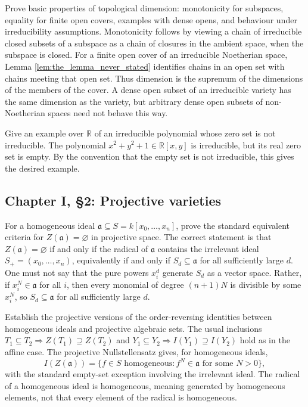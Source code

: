 \documentclass[12pt]{article}
\theoremstyle{plain}
\theoremstyle{definition}
\newcommand{\bb}[1]{\mathbb{#1}}
\begin{document}
\questionpar Prove basic properties of topological dimension: monotonicity for subspaces, equality for finite open covers, examples with dense opens, and behaviour under irreducibility assumptions.
\solutionpar Monotonicity follows by viewing a chain of irreducible closed subsets of a subspace as a chain of closures in the ambient space, when the subspace is closed. For a finite open cover of an irreducible Noetherian space, Lemma \ref{lem:the_lemma_never_stated} identifies chains in an open set with chains meeting that open set. Thus dimension is the supremum of the dimensions of the members of the cover. A dense open subset of an irreducible variety has the same dimension as the variety, but arbitrary dense open subsets of non-Noetherian spaces need not behave this way.

\questionpar Give an example over $\bb R$ of an irreducible polynomial whose zero set is not irreducible.
\solutionpar The polynomial $x^2+y^2+1\in\bb R[x,y]$ is irreducible, but its real zero set is empty. By the convention that the empty set is not irreducible, this gives the desired example.

\subsection{Chapter I, \S 2: Projective varieties}

\questionpar For a homogeneous ideal $\mathfrak a\subseteq S=k[x_0,\ldots,x_n]$, prove the standard equivalent criteria for $Z(\mathfrak a)=\varnothing$ in projective space.
\solutionpar The correct statement is that $Z(\mathfrak a)=\varnothing$ if and only if the radical of $\mathfrak a$ contains the irrelevant ideal $S_+=(x_0,\ldots,x_n)$, equivalently if and only if $S_d\subseteq\mathfrak a$ for all sufficiently large $d$. One must not say that the pure powers $x_i^d$ generate $S_d$ as a vector space. Rather, if $x_i^N\in\mathfrak a$ for all $i$, then every monomial of degree $(n+1)N$ is divisible by some $x_i^N$, so $S_d\subseteq\mathfrak a$ for all sufficiently large $d$.

\questionpar Establish the projective versions of the order-reversing identities between homogeneous ideals and projective algebraic sets.
\solutionpar The usual inclusions $T_1\subseteq T_2\Rightarrow Z(T_1)\supseteq Z(T_2)$ and $Y_1\subseteq Y_2\Rightarrow I(Y_1)\supseteq I(Y_2)$ hold as in the affine case. The projective Nullstellensatz gives, for homogeneous ideals,
\[
I(Z(\mathfrak a))=\{f\in S\text{ homogeneous}: f^N\in\mathfrak a\text{ for some }N>0\},
\]
with the standard empty-set exception involving the irrelevant ideal. The radical of a homogeneous ideal is homogeneous, meaning generated by homogeneous elements, not that every element of the radical is homogeneous.
\end{document}
